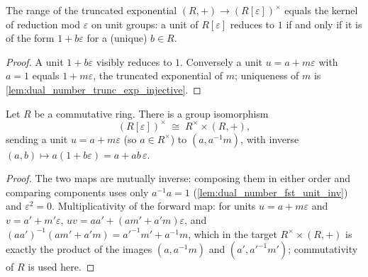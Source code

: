 \begin{lemma}\leanok
  \label{lem:dual_number_trunc_exp_exact}
  The range of the truncated exponential
  \((R,+) \to (R[\varepsilon])^{\times}\) equals the kernel of
  reduction mod \(\varepsilon\) on unit groups: a unit of
  \(R[\varepsilon]\) reduces to \(1\) if and only if it is of the form
  \(1 + b\varepsilon\) for a (unique) \(b \in R\).
\end{lemma}

\begin{proof}\leanok
  A unit \(1 + b\varepsilon\) visibly reduces to \(1\). Conversely a
  unit \(u = a + m\varepsilon\) with \(a = 1\) equals
  \(1 + m\varepsilon\), the truncated exponential of \(m\);
  uniqueness of \(m\) is
  \cref{lem:dual_number_trunc_exp_injective}.
\end{proof}

\begin{theorem}\leanok
  \label{thm:dual_number_units_split}
  Let \(R\) be a commutative ring. There is a group isomorphism
  \[
    (R[\varepsilon])^{\times} \;\cong\; R^{\times} \times (R, +),
  \]
  sending a unit \(u = a + m\varepsilon\) (so \(a \in R^{\times}\)) to
  \((a, a^{-1}m)\), with inverse
  \((a, b) \mapsto a(1 + b\varepsilon) = a + ab\,\varepsilon\).
\end{theorem}

\begin{proof}\leanok
  The two maps are mutually inverse: composing them in either order and
  comparing components uses only
  \(a^{-1}a = 1\) (\cref{lem:dual_number_fst_unit_inv}) and
  \(\varepsilon^2 = 0\). Multiplicativity of the forward map: for
  units \(u = a + m\varepsilon\) and \(v = a' + m'\varepsilon\),
  \(uv = aa' + (am' + a'm)\varepsilon\), and
  \((aa')^{-1}(am' + a'm) = a'^{-1}m' + a^{-1}m\), which in the target
  \(R^{\times} \times (R,+)\) is exactly the product of the images
  \((a, a^{-1}m)\) and \((a', a'^{-1}m')\); commutativity of \(R\) is
  used here.
\end{proof}

